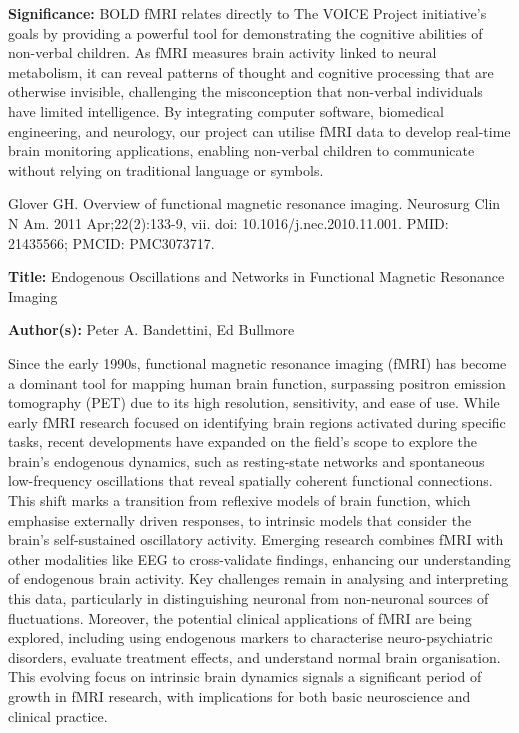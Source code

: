 \documentclass[12pt, research paper]{report}
\begin{document}
	\noindent \textbf{Significance:} BOLD fMRI relates directly to The VOICE Project initiative's goals by providing a powerful tool for demonstrating the cognitive abilities of non-verbal children. As fMRI measures brain activity linked to neural metabolism, it can reveal patterns of thought and cognitive processing that are otherwise invisible, challenging the misconception that non-verbal individuals have limited intelligence. By integrating computer software, biomedical engineering, and neurology, our project can utilise fMRI data to develop real-time brain monitoring applications, enabling non-verbal children to communicate without relying on traditional language or symbols. 
	\bigskip
	
	\noindent Glover GH. Overview of functional magnetic resonance imaging. Neurosurg Clin N Am. 2011 Apr;22(2):133-9, vii. doi: 10.1016/j.nec.2010.11.001. PMID: 21435566; PMCID: PMC3073717.
	\bigskip
	
	\noindent \textbf{Title:} Endogenous Oscillations and Networks in Functional Magnetic Resonance Imaging
	
	\noindent \textbf{Author(s):} Peter A. Bandettini, Ed Bullmore
	\bigskip
	
	Since the early 1990s, functional magnetic resonance imaging (fMRI) has become a dominant tool for mapping human brain function, surpassing positron emission tomography (PET) due to its high resolution, sensitivity, and ease of use. While early fMRI research focused on identifying brain regions activated during specific tasks, recent developments have expanded on the field's scope to explore the brain's endogenous dynamics, such as resting-state networks and spontaneous low-frequency oscillations that reveal spatially coherent functional connections. This shift marks a transition from reflexive models of brain function, which emphasise externally driven responses, to intrinsic models that consider the brain's self-sustained oscillatory activity. Emerging research combines fMRI with other modalities like EEG to cross-validate findings, enhancing our understanding of endogenous brain activity. Key challenges remain in analysing and interpreting this data, particularly in distinguishing neuronal from non-neuronal sources of fluctuations. Moreover, the potential clinical applications of fMRI are being explored, including using endogenous markers to characterise neuro-psychiatric disorders, evaluate treatment effects, and understand normal brain organisation. This evolving focus on intrinsic brain dynamics signals a significant period of growth in fMRI research, with implications for both basic neuroscience and clinical practice.
	\bigskip 
	
\end{document}
